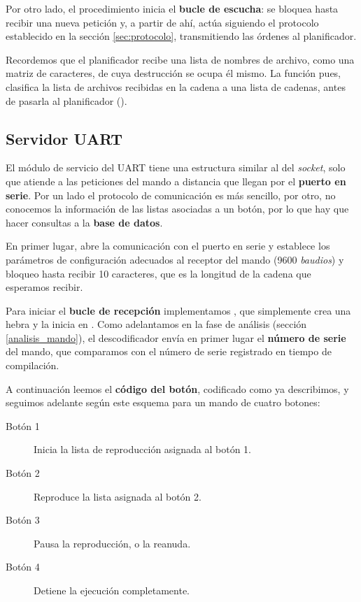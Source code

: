 Por otro lado, el procedimiento  inicia el \textbf{bucle de escucha}: se bloquea hasta recibir una nueva petición y, a partir de ahí, actúa siguiendo el protocolo establecido en la sección \ref{sec:protocolo}, transmitiendo las órdenes al planificador.

Recordemos que el planificador recibe una lista de nombres de archivo, como una matriz de caracteres, de cuya destrucción se ocupa él mismo. La función  pues, clasifica la lista de archivos recibidas en la cadena a una lista de cadenas, antes de pasarla al planificador ().

\subsection{Servidor UART}

El módulo de servicio del \acrshort{UART} tiene una estructura similar al del \textit{socket}, solo que atiende a las peticiones del mando a distancia que llegan por el \textbf{puerto en serie}. Por un lado el protocolo de comunicación es más sencillo, por otro, no conocemos la información de las listas asociadas a un botón, por lo que hay que hacer consultas a la \textbf{base de datos}.

En primer lugar,  abre la comunicación con el puerto en serie y establece los parámetros de configuración adecuados al receptor del mando (9600 \textit{baudios}) y bloqueo hasta recibir 10 caracteres, que es la longitud de la cadena que esperamos recibir.

Para iniciar el \textbf{bucle de recepción} implementamos , que simplemente crea una hebra y la inicia en . Como adelantamos en la fase de análisis (sección \ref{analisis_mando}), el descodificador envía en primer lugar el \textbf{número de serie} del mando, que comparamos con el número de serie registrado en tiempo de compilación. 

A continuación leemos el \textbf{código del botón}, codificado como ya describimos, y seguimos adelante según este esquema para un mando de cuatro botones:

\begin{description}
	\item[Botón 1] Inicia la lista de reproducción asignada al botón 1.
	\item[Botón 2] Reproduce la lista asignada al botón 2.
	\item[Botón 3] Pausa la reproducción, o la reanuda.
	\item[Botón 4] Detiene la ejecución completamente.
\end{description}

